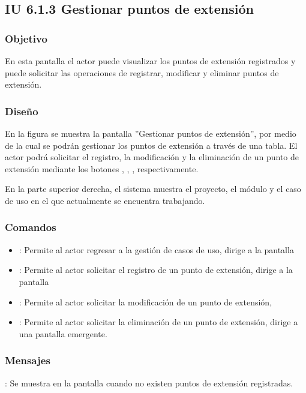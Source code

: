 \subsection{IU 6.1.3 Gestionar puntos de extensión}

\subsubsection{Objetivo}
	En esta pantalla el actor puede visualizar los puntos de extensión registrados y puede solicitar las operaciones de registrar, modificar y eliminar puntos de extensión.
\subsubsection{Diseño}
	En la figura  se muestra la pantalla ''Gestionar puntos de extensión'', por medio de la cual se podrán gestionar los puntos de extensión a través de una tabla. El actor podrá solicitar el registro, la modificación y la eliminación de un punto de extensión mediante los botones , \editar, \eliminar, respectivamente.
	
	En la parte superior derecha, el sistema muestra el proyecto, el módulo y el caso de uso en el que actualmente se encuentra trabajando.

\subsubsection{Comandos}
\begin{itemize}
	\item {}: Permite al actor regresar a la gestión de casos de uso, dirige a la pantalla 
	\item {}: Permite al actor solicitar el registro de un punto de extensión, dirige a la pantalla 
	\item \editar [Modificar]: Permite al actor solicitar la modificación de un punto de extensión, 
	\item \eliminar [Eliminar]: Permite al actor solicitar la eliminación de un punto de extensión, dirige a una pantalla emergente.
\end{itemize}

\subsubsection{Mensajes}

\begin{Citemize}
	\item {}: Se muestra en la pantalla  cuando no existen puntos de extensión registradas.
\end{Citemize}
